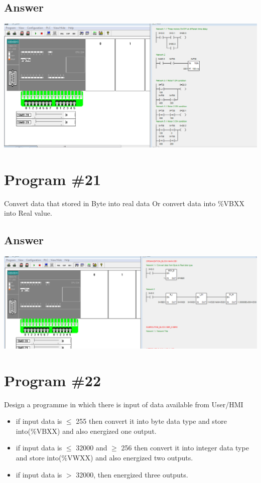 \documentclass[
	12pt, %
]{fphw}
\begin{document}
\subsection*{Answer}
 \begin{center}
 \includegraphics[width = 165mm, scale =0.9]{p20a1.png}
 \end{center}
\section*{Program \#21}
\begin{problem}
  Convert data that stored in Byte into real data Or convert data into \%VBXX
  into Real value.
  \medskip
\end{problem}
\subsection*{Answer}
 \begin{center}
 \includegraphics[width = 165mm, scale =0.9]{p21a1.png}
 \end{center}

\section*{Program \#22}
\begin{problem}
  Design a programme in which there is input of data available from User/HMI \medskip
 \begin{itemize}
  \item if input data is $\leq$ 255 then convert it into byte data type and store
    into(\%VBXX) and also energized one output. 
  \item if input data is $\leq$ 32000 and $\geq$ 256 then convert it into integer data type and store
  into(\%VWXX) and also energized two outputs.
\item if input data is $>$ 32000, then energized three outputs.
\end{itemize}
\end{problem}
\end{document}
